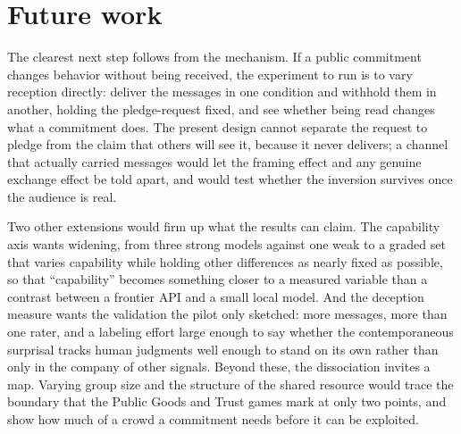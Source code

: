 \section{Future work}
\label{sec:disc-future}

The clearest next step follows from the mechanism. If a public commitment changes behavior
without being received, the experiment to run is to vary reception directly: deliver the messages
in one condition and withhold them in another, holding the pledge-request fixed, and see whether
being read changes what a commitment does. The present design cannot separate the request to
pledge from the claim that others will see it, because it never delivers; a channel that actually
carried messages would let the framing effect and any genuine exchange effect be told apart, and
would test whether the inversion survives once the audience is real.

Two other extensions would firm up what the results can claim. The capability axis wants
widening, from three strong models against one weak to a graded set that varies capability while
holding other differences as nearly fixed as possible, so that ``capability'' becomes something
closer to a measured variable than a contrast between a frontier API and a small local model. And
the deception measure wants the validation the pilot only sketched: more messages, more than one
rater, and a labeling effort large enough to say whether the contemporaneous surprisal tracks
human judgments well enough to stand on its own rather than only in the company of other signals.
Beyond these, the dissociation invites a map. Varying group size and the structure of the shared
resource would trace the boundary that the Public Goods and Trust games mark at only two points,
and show how much of a crowd a commitment needs before it can be exploited.
